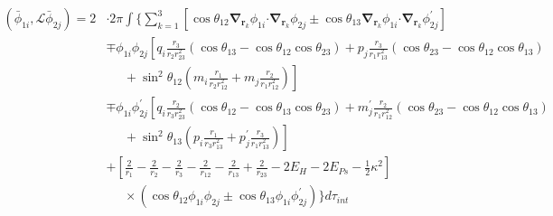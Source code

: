 \documentclass[Dissertation.tex]{subfiles}
\begin{document}
\begin{align}
\label{eq:PWavePhi1Phi2}
\left(\bar{\phi}_{1i},\mathcal{L} \bar{\phi}_{2j}\right) = 2 & \cdot 2\pi \int \Bigg\{ \sum_{k=1}^3 \left[ \cos\theta_{12} \boldsymbol{\nabla}_{\!\mathbf{r}_k} \nonumber \phi_{1i} \boldsymbol{\cdot} \boldsymbol{\nabla}_{\!\mathbf{r}_k} \phi_{2j} \pm \cos\theta_{13} \boldsymbol{\nabla}_{\!\mathbf{r}_k} \phi_{1i} \boldsymbol{\cdot} \boldsymbol{\nabla}_{\!\mathbf{r}_k} \phi_{2j}^\prime \right] \\
 \nonumber &\mp \phi_{1i} \phi_{2j} \left[q_i \frac{r_3}{r_2 r_{23}^2} (\cos\theta_{13} - \cos\theta_{12} \cos\theta_{23}) + p_j \frac{r_3}{r_1 r_{13}^2}(\cos\theta_{23}-\cos\theta_{12} \cos\theta_{13})\right.\\
 \nonumber & \left. \;\;\;\;\;  + \sin^2\theta_{12} \left(m_i \frac{r_1}{r_2 r_{12}^2} + m_j \frac{r_2}{r_1 r_{12}^2} \right) \right] \\
 \nonumber &\mp \phi_{1i} \phi_{2j}^\prime \left[q_i \frac{r_2}{r_3 r_{23}^2} (\cos\theta_{12} - \cos\theta_{13} \cos\theta_{23}) + m_j^\prime \frac{r_2}{r_1 r_{12}^2}(\cos\theta_{23}-\cos\theta_{12} \cos\theta_{13})\right.\\
 \nonumber & \left. \;\;\;\;\;  + \sin^2\theta_{13} \left(p_i \frac{r_1}{r_3 r_{13}^2} + p_j^\prime \frac{r_3}{r_1 r_{13}^2} \right) \right] \\
 \nonumber &+ \left. \left[\frac{2}{r_1} - \frac{2}{r_2} - \frac{2}{r_3} - \frac{2}{r_{12}} - \frac{2}{r_{13}} + \frac{2}{r_{23}} - 2 E_H - 2 E_{Ps} - \frac{1}{2}\kappa^2 \right] \right. \\
 &\;\;\;\;\; \times \left(\cos\theta_{12} \phi_{1i} \phi_{2j} \pm \cos\theta_{13} \phi_{1i} \phi_{2j}^\prime \right) \Bigg\} d\tau_{int}
\end{align}
\end{document}
